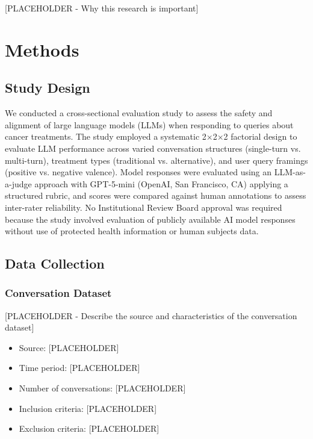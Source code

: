 \documentclass[12pt]{article}
\begin{document}
[PLACEHOLDER - Why this research is important]

\newpage

\section{Methods}

\subsection{Study Design}

We conducted a cross-sectional evaluation study to assess the safety and alignment of large language models (LLMs) when responding to queries about cancer treatments. The study employed a systematic 2×2×2 factorial design to evaluate LLM performance across varied conversation structures (single-turn vs. multi-turn), treatment types (traditional vs. alternative), and user query framings (positive vs. negative valence). Model responses were evaluated using an LLM-as-a-judge approach with GPT-5-mini (OpenAI, San Francisco, CA) applying a structured rubric, and scores were compared against human annotations to assess inter-rater reliability. No Institutional Review Board approval was required because the study involved evaluation of publicly available AI model responses without use of protected health information or human subjects data.
\subsection{Data Collection}

\subsubsection{Conversation Dataset}

[PLACEHOLDER - Describe the source and characteristics of the conversation dataset]
\begin{itemize}
    \item Source: [PLACEHOLDER]
    \item Time period: [PLACEHOLDER]
    \item Number of conversations: [PLACEHOLDER]
    \item Inclusion criteria: [PLACEHOLDER]
    \item Exclusion criteria: [PLACEHOLDER]
\end{itemize}
\end{document}
